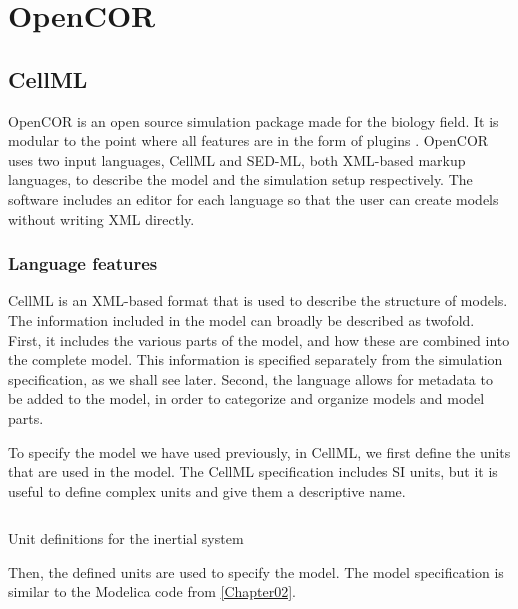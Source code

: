 \documentclass[\rootfolder/main.tex]{subfiles}
\begin{document}
\chapter{OpenCOR} %

\label{Chapter04} %

\section{CellML}

OpenCOR is an open source simulation package made for the biology field.
It is modular to the point where all features are in the form of plugins \cite{10.3389/fphys.2015.00026}.
OpenCOR uses two input languages, CellML and SED-ML, both XML-based markup languages, to describe the model and the simulation setup respectively.
The software includes an editor for each language so that the user can create models without writing XML directly.

\subsection{Language features}

CellML \cite{cuellar2003} is an XML-based format that is used to describe the structure of models.
The information included in the model can broadly be described as twofold.
First, it includes the various parts of the model, and how these are combined into the complete model.
This information is specified separately from the simulation specification, as we shall see later.
Second, the language allows for metadata to be added to the model, in order to categorize and organize models and model parts.

To specify the model we have used previously, in CellML, we first define the units that are used in the model.
The CellML specification includes SI units, but it is useful to define complex units and give them a descriptive name.

\begin{listing}[ht]
    \inputminted[fontsize=\footnotesize, lastline=27]{matlab}{\rootfolder/Models/OpenCOR/Inertial.input}
    \caption{Unit definitions for the inertial system\label{lst:inertial-cellml-units}}
\end{listing}

Then, the defined units are used to specify the model.
The model specification is similar to the Modelica code from \cref{Chapter02}.
\end{document}
